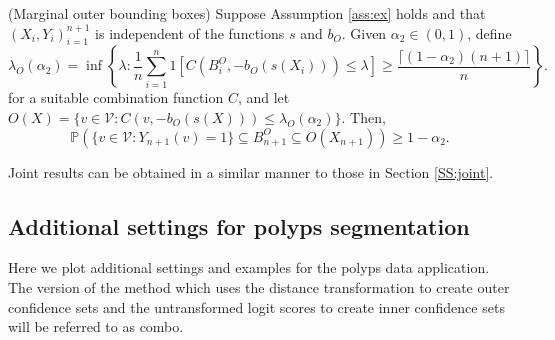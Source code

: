 \begin{corollary}\label{thm:boxgenouter}
	(Marginal outer bounding boxes)
	Suppose Assumption \ref{ass:ex} holds and that $(X_i, Y_i)_{i = 1}^{n+1}$ is independent of the functions $s$ and $b_O$. Given $\alpha_2 \in (0,1)$, define 
	\begin{equation}
		\lambda_O({\alpha_2})= \inf\left\lbrace \lambda: \frac{1}{n} \sum_{i = 1}^n 1\left[ C(B^O_i, -b_O(s(X_i))) \leq \lambda \right] \geq  \frac{\lceil (1-\alpha_2)(n+1) \rceil}{n} \right\rbrace.
	\end{equation}
	for a suitable combination function $C$, and let $O(X) = \lbrace v \in \mathcal{V}: C(v, -b_O(s(X))) \leq \lambda_O(\alpha_2)  \rbrace $. Then,
	\begin{equation*}\label{eq:probstat}
		\mathbb{P}\left( \lbrace v\in \mathcal{V}: Y_{n+1}(v) = 1 \rbrace \subseteq B^O_{n+1} \subseteq O(X_{n+1}) \right) \geq 1 - \alpha_2.
	\end{equation*}
\end{corollary}
Joint results can be obtained in a similar manner to those in Section \ref{SS:joint}.

\newpage
\subsection{Additional settings for polyps segmentation}
Here we plot additional settings and examples for the polyps data application. The version of the method which uses the distance transformation to create outer confidence sets and the untransformed logit scores to create inner confidence sets will be referred to as combo.

